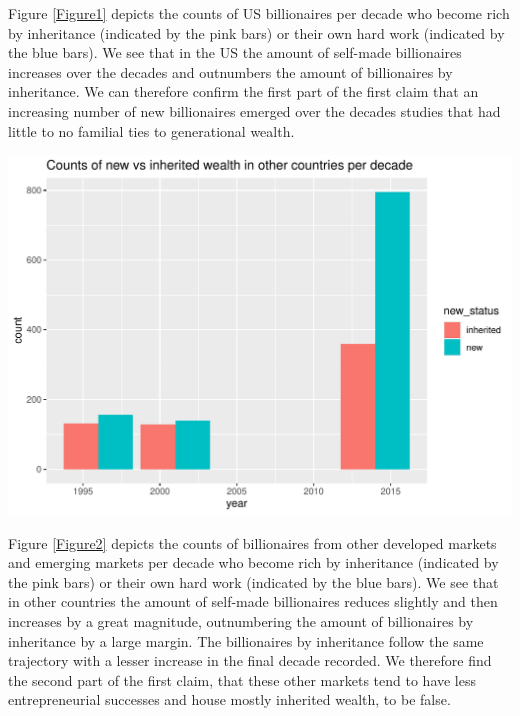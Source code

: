 \documentclass[preprint]{elsarticle}
\let\origfigure\figure
\let\endorigfigure\endfigure
\renewenvironment{figure}[1][2] {
    \expandafter\origfigure\expandafter[H]
} {
    \endorigfigure
}
\numberwithin{equation}{section}
\numberwithin{figure}{section}
\numberwithin{table}{section}
\begin{document}
Figure \ref{Figure1} depicts the counts of US billionaires per decade
who become rich by inheritance (indicated by the pink bars) or their own
hard work (indicated by the blue bars). We see that in the US the amount
of self-made billionaires increases over the decades and outnumbers the
amount of billionaires by inheritance. We can therefore confirm the
first part of the first claim that an increasing number of new
billionaires emerged over the decades studies that had little to no
familial ties to generational wealth.

\begin{figure}[H]

{\centering \includegraphics{Question4_files/figure-latex/unnamed-chunk-2-1} 

}

\caption{New vs. inherited wealth per decade (other countries)}\label{fig:unnamed-chunk-2}
\end{figure}

Figure \ref{Figure2} depicts the counts of billionaires from other
developed markets and emerging markets per decade who become rich by
inheritance (indicated by the pink bars) or their own hard work
(indicated by the blue bars). We see that in other countries the amount
of self-made billionaires reduces slightly and then increases by a great
magnitude, outnumbering the amount of billionaires by inheritance by a
large margin. The billionaires by inheritance follow the same trajectory
with a lesser increase in the final decade recorded. We therefore find
the second part of the first claim, that these other markets tend to
have less entrepreneurial successes and house mostly inherited wealth,
to be false.
\end{document}
